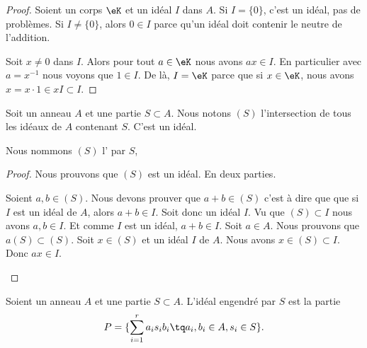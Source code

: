 \begin{proof}
	Soient un corps \( \eK\) et un idéal \( I\) dans \( A\). Si \( I=\{ 0 \}\), c'est un idéal, pas de problèmes. Si \( I\neq\{ 0 \}\), alors \( 0\in I\) parce qu'un idéal doit contenir le neutre de l'addition.

	Soit \( x\neq 0\) dans \( I\). Alors pour tout \( a\in \eK\) nous avons \( ax\in I\). En particulier avec \( a=x^{-1}\) nous voyons que \( 1\in I\). De là, \( I=\eK\) parce que si \( x\in \eK\), nous avons \( x=x\cdot 1\in xI\subset I\).
\end{proof}

\begin{propositionDef}  \label{DefSKTooOTauAR}
	Soit un anneau \( A\) et une partie \( S\subset A\). Nous notons \( (S)\) l'intersection de tous les idéaux de \( A\) contenant \( S\). C'est un idéal.

	Nous nommons \( (S)\) l' par \( S\),
\end{propositionDef}

\begin{proof}
	Nous prouvons que \( (S)\) est un idéal. En deux parties.
	\begin{subproof}
		\spitem[Somme]
		Soient \( a,b\in (S)\). Nous devons prouver que \( a+b\in (S)\) c'est à dire que que si \( I\) est un idéal de \( A\), alors \( a+b\in I\). Soit donc un idéal \( I\). Vu que \( (S)\subset I\) nous avons \( a,b\in I\). Et comme \( I\) est un idéal, \( a+b\in I\).
		\spitem[\( a(S)\subset (S)\)]
		Soit \( a\in A\). Nous prouvons que \( a(S)\subset (S)\). Soit \( x\in (S)\) et un idéal \( I\) de \( A\). Nous avons \( x\in (S)\subset I\). Donc \( ax\in I\).
	\end{subproof}
\end{proof}

\begin{proposition}	\label{PROPooDTYUooJPzPZV}
	Soient un anneau \( A\) et une partie \( S\subset A\). L'idéal engendré par \( S\) est la partie
	\begin{equation}
		P=\{ \sum_{i=1}^ra_is_ib_i \tq a_i,b_i\in A, s_i\in S \}.
	\end{equation}
\end{proposition}

